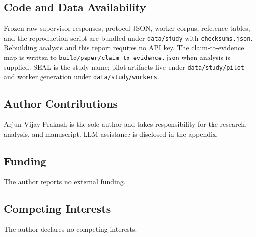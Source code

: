 \subsection*{Code and Data Availability}
Frozen raw supervisor responses, protocol JSON, worker corpus, reference tables, and the reproduction script are bundled under \texttt{data/study} with \texttt{checksums.json}. Rebuilding analysis and this report requires no API key. The claim-to-evidence map is written to \texttt{build/paper/claim\_\allowbreak{}to\_\allowbreak{}evidence.json} when analysis is supplied. SEAL is the study name; pilot artifacts live under \texttt{data/study/pilot} and worker generation under \texttt{data/study/workers}.

\subsection*{Author Contributions}
Arjun Vijay Prakash is the sole author and takes responsibility for the research, analysis, and manuscript. LLM assistance is disclosed in the appendix.

\subsection*{Funding}
The author reports no external funding.

\subsection*{Competing Interests}
The author declares no competing interests.

